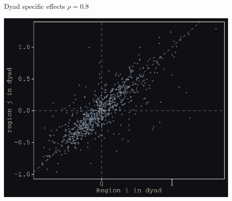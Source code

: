 \documentclass{beamer}
\begin{document}
\begin{frame}{Dyad specific effects $\rho = 0.8$}
				\begin{center}
		\includegraphics[width=0.9\textwidth]{../../fig/dyad}
	\end{center}
\end{frame}
\end{document}
